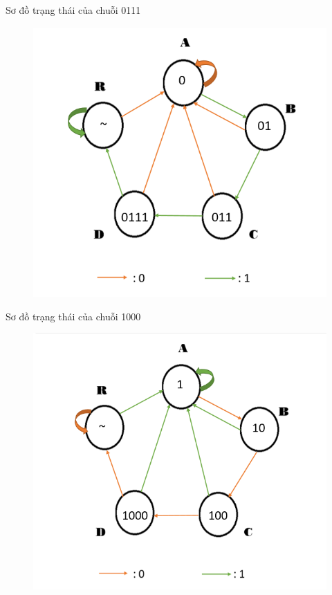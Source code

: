\documentclass[a4paper]{article}
\begin{document}
		Sơ đồ trạng thái của chuỗi 0111
	\begin{center}
	\begin{figure}[h]
		\begin{center}
			\includegraphics[scale=0.53]{0111.png}
		\end{center}
	\end{figure}
	\end{center}
	\newpage
	Sơ đồ trạng thái của chuỗi 1000
	\begin{center}
	\begin{figure}[h]
		\begin{center}
			\includegraphics[scale=0.53]{1000.png}
		\end{center}
	\end{figure}
	\end{center}
	
\end{document}
